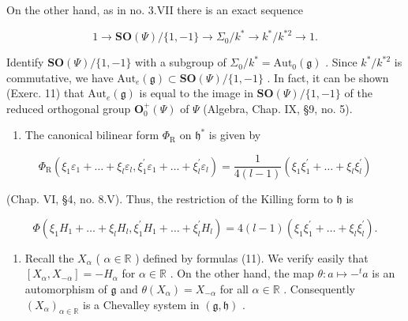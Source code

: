 On the other hand, as in no. 3.VII there is an exact sequence

\[
1 \longrightarrow \mathbf {S O} (\varPsi) / \{1, - 1 \} \longrightarrow \varSigma_ {0} / k ^ {*} \longrightarrow k ^ {*} / k ^ {* 2} \longrightarrow 1.
\]

Identify \(\mathbf{SO}(\varPsi)/\{1,-1\}\) with a subgroup of \(\Sigma_{0}/k^{*}=\mathrm{Aut}_{0}(\mathfrak{g})\) . Since \(k^{*}/k^{*2}\) is commutative, we have \(\mathrm{Aut}_{e}(\mathfrak{g})\subset\mathbf{SO}(\varPsi)/\{1,-1\}\) . In fact, it can be shown (Exerc. 11) that \(\mathrm{Aut}_{e}(\mathfrak{g})\) is equal to the image in \(\mathbf{SO}(\varPsi)/\{1,-1\}\) of the reduced orthogonal group \(\mathbf{O}_{0}^{+}(\varPsi)\) of \(\varPsi\) (Algebra, Chap. IX, §9, no. 5).

\begin{enumerate}
\def\labelenumi{(\Roman{enumi})}
\setcounter{enumi}{7}
\tightlist
\item
  The canonical bilinear form \(\varPhi_{\mathrm{R}}\) on \(\mathfrak{h}^*\) is given by
\end{enumerate}

\[
\Phi_ {\mathrm{R}} \left(\xi_ {1} \varepsilon_ {1} + \dots + \xi_ {l} \varepsilon_ {l}, \xi_ {1} ^ {\prime} \varepsilon_ {1} + \dots + \xi_ {l} ^ {\prime} \varepsilon_ {l}\right) = \frac {1}{4 (l - 1)} \left(\xi_ {1} \xi_ {1} ^ {\prime} + \dots + \xi_ {l} \xi_ {l} ^ {\prime}\right)
\]

(Chap. VI, §4, no. 8.V). Thus, the restriction of the Killing form to \(\mathfrak{h}\) is

\[
\Phi \left(\xi_ {1} H _ {1} + \dots + \xi_ {l} H _ {l}, \xi_ {1} ^ {\prime} H _ {1} + \dots + \xi_ {l} ^ {\prime} H _ {l}\right) = 4 (l - 1) \left(\xi_ {1} \xi_ {1} ^ {\prime} + \dots + \xi_ {l} \xi_ {l} ^ {\prime}\right).
\]

\begin{enumerate}
\def\labelenumi{(\Roman{enumi})}
\setcounter{enumi}{8}
\tightlist
\item
  Recall the \(X_{\alpha}\) ( \(\alpha \in \mathbb{R}\) ) defined by formulas (11). We verify easily that \([X_{\alpha}, X_{-\alpha}] = -H_{\alpha}\) for \(\alpha \in \mathbb{R}\) . On the other hand, the map \(\theta : a \mapsto -^{t}a\) is an automorphism of \(\mathfrak{g}\) and \(\theta(X_{\alpha}) = X_{-\alpha}\) for all \(\alpha \in \mathbb{R}\) . Consequently \((X_{\alpha})_{\alpha \in \mathbb{R}}\) is a Chevalley system in \((\mathfrak{g}, \mathfrak{h})\) .
\end{enumerate}

